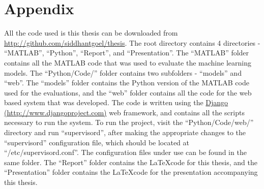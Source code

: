 \chapter{Appendix}
\label{chapter:Appendix}

All the code used is this thesis can be downloaded from \href{http://github.com/siddhantgoel/thesis}{http://github.com/siddhantgoel/thesis}. The root directory contains 4 directories - ``MATLAB'', ``Python'', ``Report'', and ``Presentation''. The ``MATLAB'' folder contains all the MATLAB code that was used to evaluate the machine learning models. The ``Python/Code/'' folder contains two subfolders - ``models'' and ``web''. The ``models'' folder contains the Python version of the MATLAB code used for the evaluations, and the ``web'' folder contains all the code for the web based system that was developed. The code is written using the \href{http://www.djangoproject.com}{Django (http://www.djangoproject.com)} web framework, and contains all the scripts necessary to run the system. To run the project, visit the ``Python/Code/web/'' directory and run ``supervisord'', after making the appropriate changes to the ``supervisord'' configuration file, which should be located at ``/etc/supervisord.conf''. The configuration files under use can be found in the same folder. The ``Report'' folder contains the \LaTeX code for this thesis, and the ``Presentation'' folder contains the \LaTeX code for the presentation accompanying this thesis.
